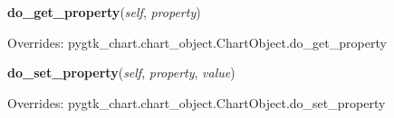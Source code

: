     \vspace{0.5ex}

\hspace{.8\funcindent}\begin{boxedminipage}{\funcwidth}

    \raggedright \textbf{do\_get\_property}(\textit{self}, \textit{property})

\setlength{\parskip}{2ex}
\setlength{\parskip}{1ex}
      Overrides: pygtk\_chart.chart\_object.ChartObject.do\_get\_property

    \end{boxedminipage}

    \vspace{0.5ex}

\hspace{.8\funcindent}\begin{boxedminipage}{\funcwidth}

    \raggedright \textbf{do\_set\_property}(\textit{self}, \textit{property}, \textit{value})

\setlength{\parskip}{2ex}
\setlength{\parskip}{1ex}
      Overrides: pygtk\_chart.chart\_object.ChartObject.do\_set\_property

    \end{boxedminipage}

    \label{pygtk_chart:line_chart:Legend:set_position}

    \vspace{0.5ex}

